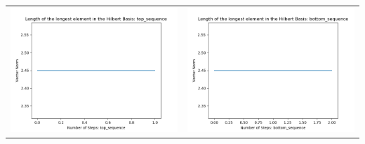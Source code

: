 \documentclass[10pt]{article}
\begin{document}
\begin{tabular}{c|c}
\begin{minipage}{.4\textwidth}
\includegraphics[width=\textwidth]{"DATA/5d/5 generators 1 bound A/top_sequence LENGTH"}
\end{minipage} &
\begin{minipage}{.4\textwidth}
\includegraphics[width=\textwidth]{"DATA/5d/5 generators 1 bound A bottomup/bottom_sequence LENGTH"}
\end{minipage}
\end{tabular}
\end{document}
